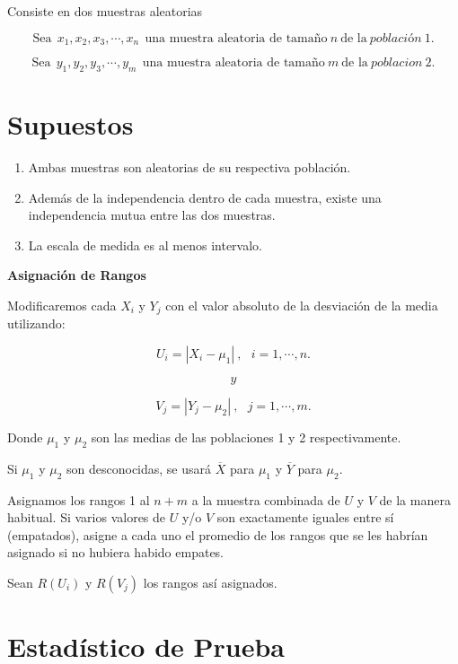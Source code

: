 \documentclass[
  a4paper,
  oneside,
  openany]{book}
\begin{document}
Consiste en dos muestras aleatorias

\[\mbox{Sea} \ \ x_{1},x_{2},x_{3},\cdots,x_{n} \ \ \mbox{una muestra aleatoria de tamaño} \  n  \ \mbox{de la} \ población \ 1.\]

\[\mbox{Sea} \ \ y_{1},y_{2},y_{3},\cdots,y_{m} \ \ \mbox{una muestra aleatoria de tamaño} \ m \  \mbox{de la} \ poblacion\ 2.\]

\hypertarget{supuestos-8}{%
\section{Supuestos}\label{supuestos-8}}

\begin{enumerate}
\def\labelenumi{\arabic{enumi})}
\item
  Ambas muestras son aleatorias de su respectiva población.
\item
  Además de la independencia dentro de cada muestra, existe una independencia mutua entre las dos muestras.
\item
  La escala de medida es al menos intervalo.
\end{enumerate}

\textbf{Asignación de Rangos}

Modificaremos cada \(X_{i}\) y \(Y_{j}\) con el valor absoluto de la desviación de la media utilizando:

\[U_{i} = |X_{i}-\mu_{1}| \ , \ \ \ i=1,\cdots,n.\]

\[y\]

\[V_{j} = |Y_{j}-\mu_{2}|\  ,\ \ \ j=1,\cdots,m.\]

Donde \(\mu_{1}\) y \(\mu_{2}\) son las medias de las poblaciones 1 y 2 respectivamente.

Si \(\mu_{1}\) y \(\mu_{2}\) son desconocidas, se usará \(\overline{X}\) para \(\mu_{1}\) y \(\overline{Y}\) para \(\mu_{2}\).

Asignamos los rangos 1 al \(n + m\) a la muestra combinada de \(U\) y \(V\) de la manera habitual.
Si varios valores de \(U\) y/o \(V\) son exactamente iguales entre sí (empatados), asigne a cada uno el promedio de los rangos que se les habrían asignado si no hubiera habido empates.

Sean \(R(U_{i})\) y \(R(V_{j})\) los rangos así asignados.

\hypertarget{estaduxedstico-de-prueba-7}{%
\section{Estadístico de Prueba}\label{estaduxedstico-de-prueba-7}}
\end{document}
